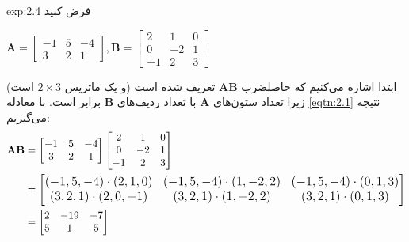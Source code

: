 {\begin{spacing}{1.5}
        \begin{example}{exp:2.4}
            \Large
            فرض کنید

            \begin{center}
                $\textbf{A}=\begin{bmatrix}
                                -1 & 5 & -4 \\
                                3  & 2 & 1
                \end{bmatrix}, \textbf{B}=\begin{bmatrix}
                                              2  & 1  & 0 \\
                                              0  & -2 & 1 \\
                                              -1 & 2  & 3
                \end{bmatrix}$
            \end{center}

            ابتدا اشاره می‌کنیم که حاصلضرب $\textbf{AB}$ تعریف شده است (و یک ماتریس $2\times 3$ است) زیرا تعداد ستون‌های $\textbf{A}$ با تعداد ردیف‌های $\textbf{B}$ برابر است. با معادله \ref{eqtn:2.1} نتیجه می‌گیریم:
            \begin{equation*}
                \centering
                \begin{split}
                    \textbf{AB}&=\begin{bmatrix}
                                     -1 & 5 & -4 \\
                                     3  & 2 & 1
                    \end{bmatrix}\begin{bmatrix}
                                     2  & 1  & 0 \\
                                     0  & -2 & 1 \\
                                     -1 & 2  & 3
                    \end{bmatrix}\\
                    &={\large\begin{bmatrix}
                    (-1,5,-4)
                                 \cdot(2,1,0)         & (-1,5,-4)\cdot(1,-2,2) & (-1,5,-4)\cdot(0,1,3) \\
                                 (3,2,1)\cdot(2,0,-1) & (3,2,1)\cdot(1,-2,2)   & (3,2,1)\cdot(0,1,3)
                    \end{bmatrix}}\\
                    &=\begin{bmatrix}
                          2 & -19 & -7 \\
                          5 & 1   & 5
                    \end{bmatrix}
                \end{split}
            \end{equation*}


\end{example}
\end{spacing}}
